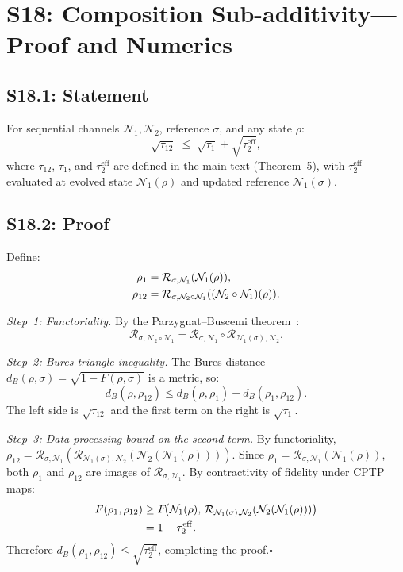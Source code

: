 \documentclass[prl,twocolumn,superscriptaddress,longbibliography]{revtex4-2}
\newcommand{\Petz}{\mathcal{R}}
\newcommand{\chan}{\mathcal{N}}
\newcommand{\tauasym}{\tau}
\begin{document}
\section{S18: Composition Sub-additivity---Proof and Numerics}
\label{sec:S18}

\subsection{S18.1: Statement}

For sequential channels $\chan_1, \chan_2$, reference $\sigma$,
and any state $\rho$:
\begin{equation}
\sqrt{\tauasym_{12}}
\;\leq\; \sqrt{\tauasym_1}
+ \sqrt{\tauasym_2^{\mathrm{eff}}},
\label{eq:comp_supp}
\end{equation}
where $\tauasym_{12}$, $\tauasym_1$, and
$\tauasym_2^{\mathrm{eff}}$ are defined in the main text
(Theorem~5), with $\tauasym_2^{\mathrm{eff}}$ evaluated at
evolved state $\chan_1(\rho)$ and updated reference
$\chan_1(\sigma)$.

\subsection{S18.2: Proof}

Define:
\begin{align}
\rho_1 &= \Petz_{\sigma,\chan_1}(\chan_1(\rho)),
  \notag\\
\rho_{12} &= \Petz_{\sigma,\chan_2\circ\chan_1}
  ((\chan_2\circ\chan_1)(\rho)).
\end{align}

\emph{Step~1: Functoriality.}
By the Parzygnat--Buscemi theorem~\cite{Parzygnat2023}:
\begin{equation}
\Petz_{\sigma,\chan_2\circ\chan_1}
= \Petz_{\sigma,\chan_1}\circ
  \Petz_{\chan_1(\sigma),\chan_2}.
\end{equation}

\emph{Step~2: Bures triangle inequality.}
The Bures distance
$d_B(\rho,\sigma) = \sqrt{1-F(\rho,\sigma)}$ is a metric, so:
\begin{equation}
d_B(\rho,\rho_{12})
\leq d_B(\rho,\rho_1)
+ d_B(\rho_1,\rho_{12}).
\end{equation}
The left side is $\sqrt{\tauasym_{12}}$ and the first term on
the right is $\sqrt{\tauasym_1}$.

\emph{Step~3: Data-processing bound on the second term.}
By functoriality,
$\rho_{12} = \Petz_{\sigma,\chan_1}
(\Petz_{\chan_1(\sigma),\chan_2}(\chan_2(\chan_1(\rho))))$.
Since $\rho_1 = \Petz_{\sigma,\chan_1}(\chan_1(\rho))$, both
$\rho_1$ and $\rho_{12}$ are images of $\Petz_{\sigma,\chan_1}$.
By contractivity of fidelity under CPTP maps:
\begin{align}
F(\rho_1,\rho_{12})
&\geq F\!\big(\chan_1(\rho),\,
  \Petz_{\chan_1(\sigma),\chan_2}(\chan_2(\chan_1(\rho)))\big)
  \notag\\
&= 1 - \tauasym_2^{\mathrm{eff}}.
\end{align}
Therefore $d_B(\rho_1,\rho_{12})
\leq \sqrt{\tauasym_2^{\mathrm{eff}}}$, completing the
proof.\hfill$\square$
\end{document}
